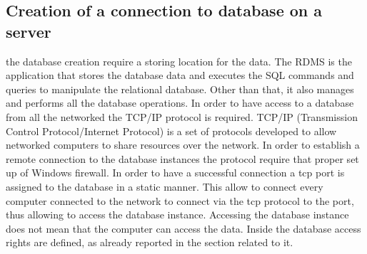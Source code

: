 \documentclass[../main.tex]{subfiles}
\begin{document}
\subsection{Creation of a connection to database on a server}
the database creation require a storing location for the data. The \gls{RDMS} is the application that stores the database data and executes the SQL commands and queries to manipulate the relational database. Other than that, it also manages and performs all the database operations. In order to have access to a database from all the networked the \gls{TCP/IP} protocol is required. \gls{TCP/IP} (Transmission Control Protocol/Internet Protocol) is a set of protocols developed to allow networked computers to share resources over the network. In order to establish a remote connection to the database instances the protocol require that proper set up of Windows firewall. In order to have  a successful connection a tcp port is assigned to the database in a static manner. 
This allow to connect every computer connected to the network to connect via the tcp protocol to the port, thus allowing to access the database instance. Accessing the database instance does not mean that the computer can access the data. Inside the database access rights are defined, as already reported in the section related to it.
\end{document}
